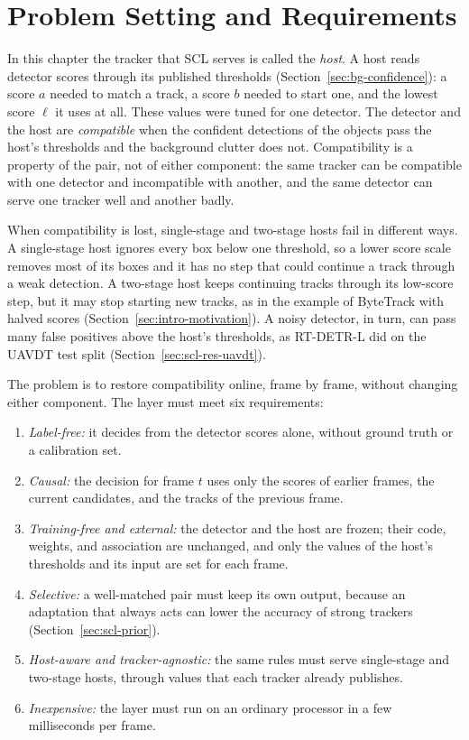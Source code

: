 \section{Problem Setting and Requirements}\label{sec:scl-setting}
In this chapter the tracker that SCL serves is called the \emph{host}. A host reads detector scores through its published thresholds (Section~\ref{sec:bg-confidence}): a score $a$ needed to match a track, a score $b$ needed to start one, and the lowest score $\ell$ it uses at all. These values were tuned for one detector. The detector and the host are \emph{compatible} when the confident detections of the objects pass the host's thresholds and the background clutter does not. Compatibility is a property of the pair, not of either component: the same tracker can be compatible with one detector and incompatible with another, and the same detector can serve one tracker well and another badly.

When compatibility is lost, single-stage and two-stage hosts fail in different ways. A single-stage host ignores every box below one threshold, so a lower score scale removes most of its boxes and it has no step that could continue a track through a weak detection. A two-stage host keeps continuing tracks through its low-score step, but it may stop starting new tracks, as in the example of ByteTrack with halved scores (Section~\ref{sec:intro-motivation}). A noisy detector, in turn, can pass many false positives above the host's thresholds, as RT-DETR-L did on the UAVDT test split (Section~\ref{sec:scl-res-uavdt}).

The problem is to restore compatibility online, frame by frame, without changing either component. The layer must meet six requirements:
\begin{enumerate}
\item \emph{Label-free:} it decides from the detector scores alone, without ground truth or a calibration set.
\item \emph{Causal:} the decision for frame $t$ uses only the scores of earlier frames, the current candidates, and the tracks of the previous frame.
\item \emph{Training-free and external:} the detector and the host are frozen; their code, weights, and association are unchanged, and only the values of the host's thresholds and its input are set for each frame.
\item \emph{Selective:} a well-matched pair must keep its own output, because an adaptation that always acts can lower the accuracy of strong trackers (Section~\ref{sec:scl-prior}).
\item \emph{Host-aware and tracker-agnostic:} the same rules must serve single-stage and two-stage hosts, through values that each tracker already publishes.
\item \emph{Inexpensive:} the layer must run on an ordinary processor in a few milliseconds per frame.
\end{enumerate}

